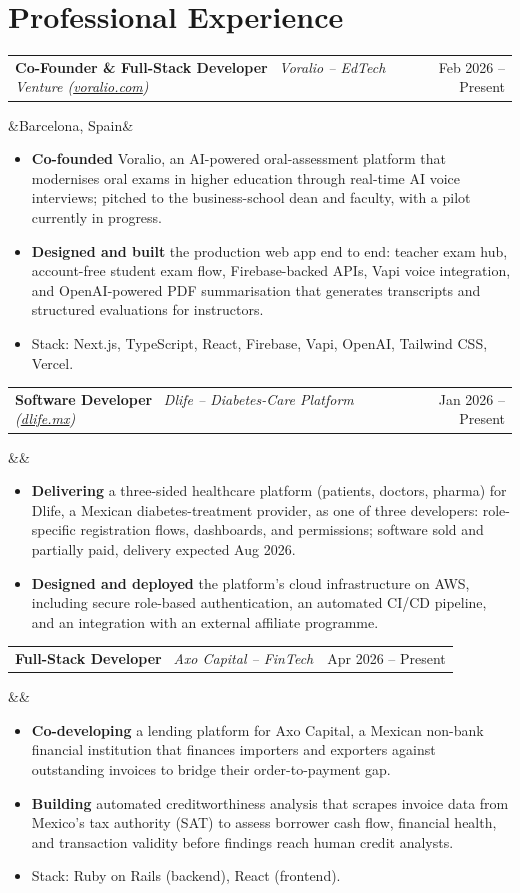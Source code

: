 \documentclass[10pt, a4paper]{article}
\makeatletter
\newcommand{\cventry}[5]{%
  \noindent
  \begin{tabularx}{\linewidth}{@{}X r@{}}
    {\bfseries #2} \, {\normalsize\textit{#3}} &
    {\small\color{mutedcolor}#1}
  \end{tabularx}%
  \ifx&#4&\else\par\noindent{\small\color{mutedcolor}\faMapMarker*\enspace #4}\fi
  \par #5\vspace{2pt}%
}
\newenvironment{cvlist}{%
  \begin{itemize}[leftmargin=1.2em, label=\textcolor{headcolor}{\small$\bullet$},
    itemsep=1pt, parsep=0pt, topsep=2pt]
}{\end{itemize}}
\makeatother
\begin{document}
\section{Professional Experience}

\cventry{Feb 2026 -- Present}
  {Co-Founder \& Full-Stack Developer}
  {Voralio -- EdTech Venture (\href{https://voralio.com}{voralio.com})}
  {Barcelona, Spain}
  {%
    \begin{cvlist}
      \item \textbf{Co-founded} Voralio, an AI-powered oral-assessment platform that modernises oral exams in higher education through real-time AI voice interviews; pitched to the business-school dean and faculty, with a pilot currently in progress.
      \item \textbf{Designed and built} the production web app end to end: teacher exam hub, account-free student exam flow, Firebase-backed APIs, Vapi voice integration, and OpenAI-powered PDF summarisation that generates transcripts and structured evaluations for instructors.
      \item Stack: Next.js, TypeScript, React, Firebase, Vapi, OpenAI, Tailwind CSS, Vercel.
    \end{cvlist}
  }

\cventry{Jan 2026 -- Present}
  {Software Developer}
  {Dlife -- Diabetes-Care Platform (\href{https://www.dlife.mx}{dlife.mx})}
  {}
  {%
    \begin{cvlist}
      \item \textbf{Delivering} a three-sided healthcare platform (patients, doctors, pharma) for Dlife, a Mexican diabetes-treatment provider, as one of three developers: role-specific registration flows, dashboards, and permissions; software sold and partially paid, delivery expected Aug 2026.
      \item \textbf{Designed and deployed} the platform's cloud infrastructure on AWS, including secure role-based authentication, an automated CI/CD pipeline, and an integration with an external affiliate programme.
    \end{cvlist}
  }

\cventry{Apr 2026 -- Present}
  {Full-Stack Developer}
  {Axo Capital -- FinTech}
  {}
  {%
    \begin{cvlist}
      \item \textbf{Co-developing} a lending platform for Axo Capital, a Mexican non-bank financial institution that finances importers and exporters against outstanding invoices to bridge their order-to-payment gap.
      \item \textbf{Building} automated creditworthiness analysis that scrapes invoice data from Mexico's tax authority (SAT) to assess borrower cash flow, financial health, and transaction validity before findings reach human credit analysts.
      \item Stack: Ruby on Rails (backend), React (frontend).
    \end{cvlist}
  }
\end{document}
